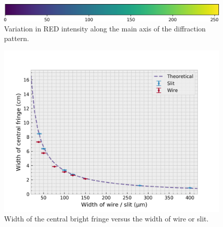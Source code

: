 \documentclass[a4paper, 12pt]{article}
\begin{document}
\begin{figure}[H]
    \renewcommand{\thesubfigure}{e}
    \renewcommand{\thesubfigure}{k}

    \renewcommand{\thesubfigure}{f}
    \renewcommand{\thesubfigure}{l}
    
    \centering
    \includegraphics[width=\textwidth]{scripts/processed-data/colour-bar.png}
    
    \caption{Variation in RED intensity along the main axis of the diffraction pattern. }
    \label{fig:processed-patterns}
\end{figure}

\begin{figure}[H]
    \centering
    \includegraphics[width=\textwidth]{img/data}
    \caption{Width of the central bright fringe versus the width of wire or slit. }
    \label{fig:data}
\end{figure}
\end{document}
